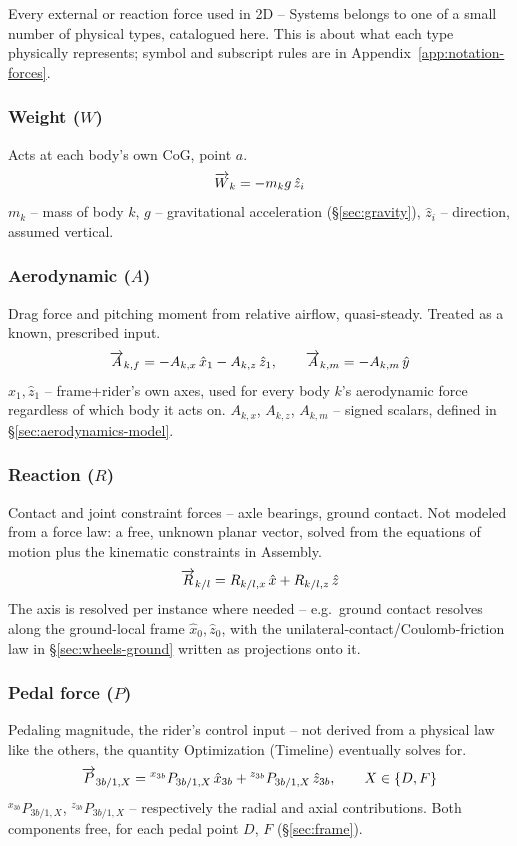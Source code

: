 Every external or reaction force used in 2D -- Systems belongs to one of a small number of physical types, catalogued here. This is about what each type physically represents; symbol and subscript rules are in Appendix~\ref{app:notation-forces}.

\subsubsection{Weight ($W$)}
Acts at each body's own CoG, point $a$.
\begin{equation}
    \overrightarrow{W}_k = -m_k g\,\hat{z}_i
\end{equation}
$m_k$ -- mass of body $k$, $g$ -- gravitational acceleration (\S\ref{sec:gravity}), $\hat{z}_i$ -- direction, assumed vertical.

\subsubsection{Aerodynamic ($A$)}
Drag force and pitching moment from relative airflow, quasi-steady. Treated as a known, prescribed input.
\begin{equation}
    \overrightarrow{A}_{k,f} = -A_{k,x}\,\hat{x}_1 - A_{k,z}\,\hat{z}_1, \qquad \overrightarrow{A}_{k,m} = -A_{k,m}\,\hat{y}
\end{equation}
$\hat{x}_1,\hat{z}_1$ -- frame+rider's own axes, used for every body $k$'s aerodynamic force regardless of which body it acts on. $A_{k,x}$, $A_{k,z}$, $A_{k,m}$ -- signed scalars, defined in \S\ref{sec:aerodynamics-model}.

\subsubsection{Reaction ($R$)}
Contact and joint constraint forces -- axle bearings, ground contact. Not modeled from a force law: a free, unknown planar vector, solved from the equations of motion plus the kinematic constraints in Assembly.
\begin{equation}
    \overrightarrow{R}_{k/l} = R_{k/l,x}\,\hat{x} + R_{k/l,z}\,\hat{z}
\end{equation}
The axis is resolved per instance where needed -- e.g.\ ground contact resolves along the ground-local frame $\hat{x}_0,\hat{z}_0$, with the unilateral-contact/Coulomb-friction law in \S\ref{sec:wheels-ground} written as projections onto it.

\subsubsection{Pedal force ($P$)}
Pedaling magnitude, the rider's control input -- not derived from a physical law like the others, the quantity Optimization (Timeline) eventually solves for.
\begin{equation}
    \overrightarrow{P}_{3b/1,X} = {}^{x_{3b}}P_{3b/1,X}\,\hat{x}_{3b} + {}^{z_{3b}}P_{3b/1,X}\,\hat{z}_{3b}, \qquad X\in\{D,F\}
\end{equation}
${}^{x_{3b}}P_{3b/1,X}$, ${}^{z_{3b}}P_{3b/1,X}$ -- respectively the radial and axial contributions. Both components free, for each pedal point $D$, $F$ (\S\ref{sec:frame}).

